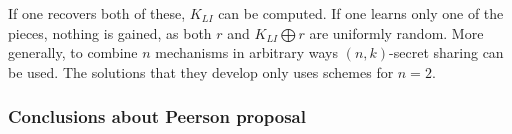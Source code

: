   If one recovers both of these, $K_{LI}$ can be computed. If one learns only one
 of the pieces, nothing is gained, as both $r$ and $K_{LI} \bigoplus r$ are
 uniformly random. More generally, to combine $n$ mechanisms
  in arbitrary ways $(n, k)$-secret sharing can be used. The solutions that
they develop only uses schemes for $n = 2$.\\




\subsubsection{Conclusions about Peerson proposal}



%
%
%

